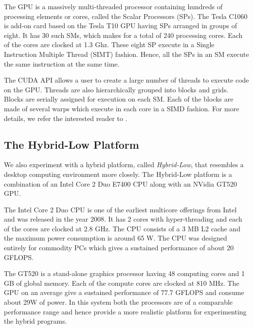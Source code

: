 \documentclass[11pt]{article}
\begin{document}
The GPU is a massively multi-threaded processor
containing hundreds of processing elements or cores,
called the Scalar Processors (SPs). The Tesla C1060
is add-on card based on the Tesla T10 GPU\cite{tesla_spec} having 
SPs arranged in groups of eight. It has 30 such SMs,
which makes for a total of 240 processing cores. Each
of the cores are clocked at 1.3 Ghz. These eight SP
execute in a Single Instruction Multiple Thread (SIMT)
fashion. Hence, all the SPs in an SM execute the same
instruction at the same time.

The CUDA API allows a user to create a large number
of threads to execute code on the GPU. Threads are also
hierarchically grouped into blocks and grids. Blocks
are serially assigned for execution on each SM. Each of
the blocks are made of several warps which execute in each
core in a SIMD fashion. For more details, we refer the interested
reader to \cite{cuda}.


\subsection{The Hybrid-Low Platform}
We also experiment with a hybrid platform, called {\em Hybrid-Low}, 
that resembles a desktop computing environment more closely. 
The Hybrid-Low platform is a combination of an 
Intel Core 2 Duo E7400 CPU along with an NVidia GT520 GPU. 

The Intel Core 2 Duo CPU is one of the earliest multicore offerings from
Intel and was released in the year 2008. It has 2 cores with hyper-threading
and each of the cores are clocked at 2.8 GHz. The CPU consists of a 3 MB
L2 cache and the maximum power consumption is around 65 W. The CPU was
designed entirely for commodity PCs which gives a sustained performance
of about 20 GFLOPS. 

The GT520 is a stand-alone graphics processor having 48 computing cores 
and 1 GB of global memory. Each of the compute cores are clocked at 810 MHz.
The GPU on an average give a sustained performance of 77.7 GFLOPS and consume
about 29W of power. In this system both the processors are of a
comparable performance range
and hence provide a more realistic platform for experimenting the hybrid
programs.
\end{document}
